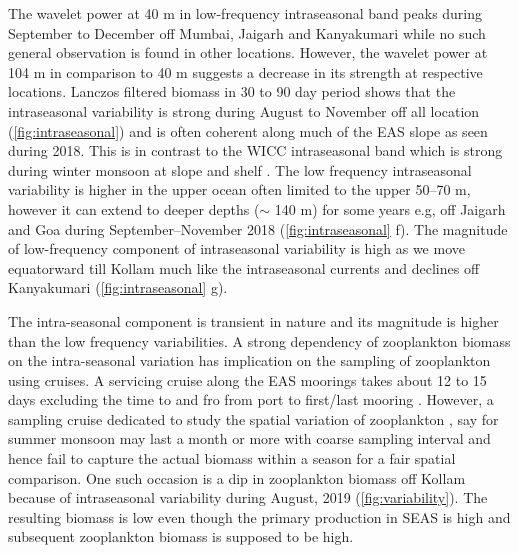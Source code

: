 \documentclass{article}
\begin{document}
    The wavelet power at 40 m in low-frequency intraseasonal band peaks during September to December off Mumbai, Jaigarh and Kanyakumari while no such general observation is found in other locations. However, the wavelet power at 104 m in comparison to 40 m suggests a decrease in its strength at respective locations. Lanczos filtered biomass in 30 to 90 day period shows that the intraseasonal variability is strong during August to November off all location (\cref{fig:intraseasonal}) and is often coherent along much of the EAS slope as seen during 2018. This is in contrast to the WICC intraseasonal band which is strong during winter monsoon at slope \citep{amol2014observed, chaudhuri2020observed} and shelf \citep{chaudhuri2021observed}. The low frequency intraseasonal variability is higher in the upper ocean often limited to the upper 50--70 m, however it can extend to deeper depths ($\sim$ 140 m) for some years e.g, off Jaigarh and Goa during September--November 2018 (\cref{fig:intraseasonal} f). The magnitude of low-frequency component of intraseasonal variability is high as we move equatorward till Kollam much like the intraseasonal currents \citep{amol2014observed,chaudhuri2020observed,chaudhuri2021observed} and declines off Kanyakumari (\cref{fig:intraseasonal} g). 
    
    The intra-seasonal component is transient in nature and its magnitude is higher than the low frequency variabilities. A strong dependency of zooplankton biomass on the intra-seasonal variation has implication on the sampling of zooplankton using cruises.     A servicing cruise along the EAS moorings takes about 12 to 15 days excluding the time to and fro from port to first/last mooring \citep{ chaudhuri2020observed, aparna2022seasonal}. However, a sampling cruise dedicated to study the spatial variation of zooplankton \citep{madhupratap1992zooplankton,smith1998seasonal,wishner1998mesozooplankton, kidwai2000dd}, say for summer monsoon may last a month or more with coarse sampling interval and hence fail to capture the actual biomass within a season for a fair spatial comparison. One such occasion is a dip in zooplankton biomass off Kollam because of intraseasonal variability during August, 2019 (\cref{fig:variability}). The resulting biomass is low even though the primary production in SEAS \citep{ashadevi20101070, jyothibabu2010re} is high and subsequent zooplankton biomass is supposed to be high. 
    
\end{document}
